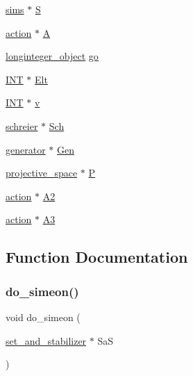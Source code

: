 \begin{DoxyCompactItemize}
\item 
\mbox{\hyperlink{classsims}{sims}} $\ast$ \mbox{\hyperlink{simeon_8_c_adab47f8243f1b5a2c31df2535d6b37d0}{S}}
\item 
\mbox{\hyperlink{classaction}{action}} $\ast$ \mbox{\hyperlink{simeon_8_c_a97833f04c3a9c008df5521a2fc291bb4}{A}}
\item 
\mbox{\hyperlink{classlonginteger__object}{longinteger\+\_\+object}} \mbox{\hyperlink{simeon_8_c_a1516b736c8ebbfb03a9dd7d8826cd9a6}{go}}
\item 
\mbox{\hyperlink{galois_8h_a09fddde158a3a20bd2dcadb609de11dc}{I\+NT}} $\ast$ \mbox{\hyperlink{simeon_8_c_aec1406935bdb1fee3561fcb840964100}{Elt}}
\item 
\mbox{\hyperlink{galois_8h_a09fddde158a3a20bd2dcadb609de11dc}{I\+NT}} $\ast$ \mbox{\hyperlink{simeon_8_c_aeb3f3030944801b163bc3b829a7f6710}{v}}
\item 
\mbox{\hyperlink{classschreier}{schreier}} $\ast$ \mbox{\hyperlink{simeon_8_c_acbdfb9c3c18b898a9750f161e7255a6c}{Sch}}
\item 
\mbox{\hyperlink{classgenerator}{generator}} $\ast$ \mbox{\hyperlink{simeon_8_c_a77f431291e80a101f725d3a28a3f42c8}{Gen}}
\item 
\mbox{\hyperlink{classprojective__space}{projective\+\_\+space}} $\ast$ \mbox{\hyperlink{simeon_8_c_a7fa15551e800919e93401fbbcd8e71e8}{P}}
\item 
\mbox{\hyperlink{classaction}{action}} $\ast$ \mbox{\hyperlink{simeon_8_c_a13fda35b8976a20080ec22b9d9e44e5b}{A2}}
\item 
\mbox{\hyperlink{classaction}{action}} $\ast$ \mbox{\hyperlink{simeon_8_c_a24df86d57df5e92613e47444f1d458ea}{A3}}
\end{DoxyCompactItemize}


\subsection{Function Documentation}
\mbox{\label{simeon_8_c_a36cf3f9cb484fa44da7a7dfcbe9385d0}} 
\subsubsection{\texorpdfstring{do\+\_\+simeon()}{do\_simeon()}}
{\footnotesize\ttfamily void do\+\_\+simeon (\begin{DoxyParamCaption}\item[{\mbox{\hyperlink{classset__and__stabilizer}{set\+\_\+and\+\_\+stabilizer}} $\ast$}]{SaS }\end{DoxyParamCaption})}

